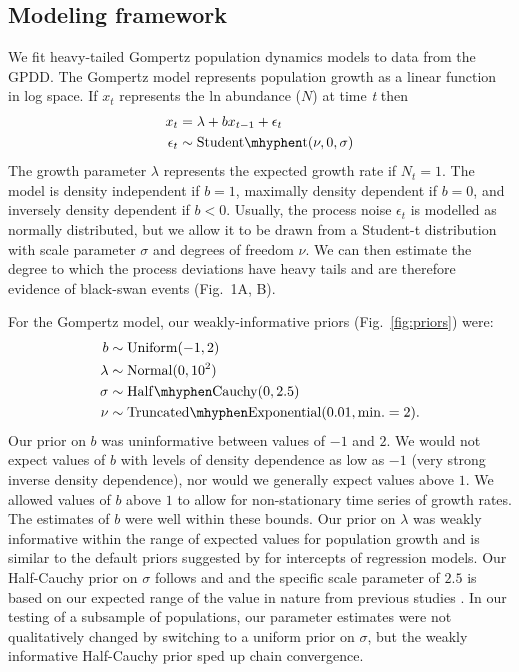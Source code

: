\subsection{Modeling framework}

We fit heavy-tailed Gompertz population dynamics models to data from the GPDD. The Gompertz model represents population growth as a linear function in log space. If \(x_{t}\) represents the ln abundance (\(N\)) at time \emph{t} then
\begin{align}
x_t &= \lambda + bx_{t - 1} + \epsilon_t\\
\epsilon_t &\sim \mathrm{Student\mhyphen t}(\nu, 0, \sigma)
\end{align}
The growth parameter \(\lambda\) represents the expected growth rate if \(N_{t}
= 1\). The model is density independent if \(b = 1\), maximally density
dependent if \(b = 0\), and inversely density dependent if \(b < 0\). Usually,
the process noise \(\epsilon_{t}\) is modelled as normally distributed, but we
allow it to be drawn from a Student-t distribution with scale parameter
\(\sigma\) and degrees of freedom \(\nu\). We can then estimate the degree to
which the process deviations have heavy tails and are therefore evidence of
black-swan events (Fig.~1A, B).

For the Gompertz model, our weakly-informative priors (Fig.~\ref{fig:priors}) were:
\begin{align}
b &\sim \mathrm{Uniform}(-1, 2)\\ \lambda &\sim \mathrm{Normal}(0, 10^2)\\
\sigma &\sim \mathrm{Half\mhyphen Cauchy} (0, 2.5)\\ \nu &\sim
\mathrm{Truncated\mhyphen Exponential}(0.01, \mathrm{min.} = 2).
\end{align}
Our prior on \(b\) was uninformative between values of \(-1\) and \(2\). We
would not expect values of \(b\) with levels of density dependence as low as
\(-1\) (very strong inverse density dependence), nor would we generally expect
values above \(1\). We allowed values of \(b\) above \(1\) to allow for
non-stationary time series of growth rates. The estimates of \(b\) were well
within these bounds. Our prior on \(\lambda\) was weakly informative within the
range of expected values for population growth and is similar to the default
priors suggested by \citet{gelman2008d} for intercepts of
regression models. Our Half-Cauchy prior on \(\sigma\) follows
\citet{gelman2006c} and \citet{gelman2008d} and the specific scale parameter of
\(2.5\) is based on our expected range of the value in nature from previous
studies \citep{connors2014}. In our testing of a subsample of populations, our
parameter estimates were not qualitatively changed by switching to a uniform
prior on \(\sigma\), but the weakly informative Half-Cauchy prior sped up chain
convergence.

